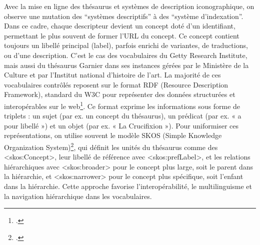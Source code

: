Avec la mise en ligne des thésaurus et systèmes de description iconographique, on observe une mutation des “systèmes descriptifs” à des “système d’indexation”. Dans ce cadre, chaque descripteur devient un concept doté d’un identifiant, permettant le plus souvent de former l’URL du concept. Ce concept contient toujours un libellé principal (label), parfois enrichi de variantes, de traductions, ou d’une description. C’est le cas des vocabulaires du Getty Research Institute, mais aussi du thésaurus Garnier dans ses instances gérées par le Ministère de la Culture et par l’Institut national d’histoire de l’art. La majorité de ces vocabulaires contrôlés reposent sur le format RDF (Resource Description Framework), standard du W3C pour représenter des données structurées et interopérables sur le web\footcite{rdfworkinggroupResourceDescriptionFramework2014}. Ce format exprime les informations sous forme de triplets : un sujet (par ex. un concept du thésaurus), un prédicat (par ex. « a pour libellé ») et un objet (par ex. « La Crucifixion »). Pour uniformiser ces représentations, on utilise souvent le modèle SKOS (Simple Knowledge Organization System)\footcite{milesSKOSSimpleKnowledge2009}, qui définit les unités du thésaurus comme des <skos:Concept>, leur libellé de référence avec <skos:prefLabel>, et les relations hiérarchiques avec <skos:broader> pour le concept plus large, soit le parent dans la hiérarchie, et <skos:narrower> pour le concept plus spécifique, soit l’enfant dans la hiérarchie. Cette approche favorise l’interopérabilité, le multilinguisme et la navigation hiérarchique dans les vocabulaires.
